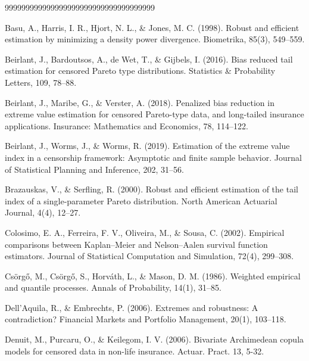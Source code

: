 \documentclass[reqno,openbib,runningheads,a4paper,12pt]{amsart}%
\begin{document}
\begin{thebibliography}{999999999999999999999999999999999999}                                                             %


Basu, A., Harris, I. R., Hjort, N.
L., \& Jones, M. C. (1998). Robust and efficient estimation by minimizing a
density power divergence. Biometrika, 85(3), 549--559.

Beirlant, J., Bardoutsos,
A., de Wet, T., \& Gijbels, I. (2016). Bias reduced tail estimation for
censored Pareto type distributions. Statistics \& Probability Letters, 109, 78--88.

Beirlant, J., Maribe, G., \&
Verster, A. (2018). Penalized bias reduction in extreme value estimation for
censored Pareto-type data, and long-tailed insurance applications. Insurance:
Mathematics and Economics, 78, 114--122.

Beirlant, J., Worms, J., \&
Worms, R. (2019). Estimation of the extreme value index in a censorship
framework: Asymptotic and finite sample behavior. Journal of Statistical
Planning and Inference, 202, 31--56.

Brazauskas, V., \& Serfling, R.
(2000). Robust and efficient estimation of the tail index of a
single-parameter Pareto distribution. North American Actuarial Journal, 4(4), 12--27.

Colosimo, E. A.,
Ferreira, F. V., Oliveira, M., \& Sousa, C. (2002). Empirical comparisons
between Kaplan--Meier and Nelson--Aalen survival function estimators. Journal
of Statistical Computation and Simulation, 72(4), 299--308.

Cs\"{o}rg\H{o}, M.,
Cs\"{o}rg\H{o}, S., Horv\'{a}th, L., \& Mason, D. M. (1986). Weighted
empirical and quantile processes. Annals of Probability, 14(1), 31--85.

Dell'Aquila, R., \&
Embrechts, P. (2006). Extremes and robustness: A contradiction? Financial
Markets and Portfolio Management, 20(1), 103--118.

Denuit, M., Purcaru, O., \&
Keilegom, I. V. (2006). Bivariate Archimedean copula models for censored data
in non-life insurance. Actuar. Pract. 13, 5-32.


\end{thebibliography}
\end{document}
